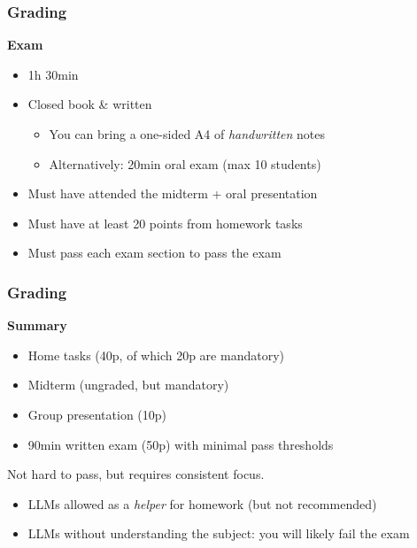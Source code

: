 \begin{frame}
  \frametitle{Grading}

  \textbf{Exam}
  \begin{itemize}[<+(1)->]
    \item 1h 30min
    \item Closed book \& written
    \begin{itemize}
      \item You can bring a one-sided A4 of \emph{handwritten} notes
      \item Alternatively: 20min oral exam (max 10 students)
    \end{itemize}
    \item Must have attended the midterm + oral presentation
    \item Must have at least 20 points from homework tasks
    \item Must pass each exam section to pass the exam
  \end{itemize}
\end{frame}

\begin{frame}
  \frametitle{Grading}

  \textbf{Summary}
  \begin{itemize}[<+(1)->]
    \item Home tasks (40p, of which 20p are mandatory)
    \item Midterm (ungraded, but mandatory)
    \item Group presentation (10p) 
    \item 90min written exam (50p) with minimal pass thresholds
  \end{itemize}

  \vspace*{1em}

  \pause
  Not hard to pass, but requires consistent focus.
  \begin{itemize}
    \item LLMs allowed as a \emph{helper} for homework (but not recommended)
    \item LLMs without understanding the subject: you will likely fail the exam
  \end{itemize}
\end{frame}

